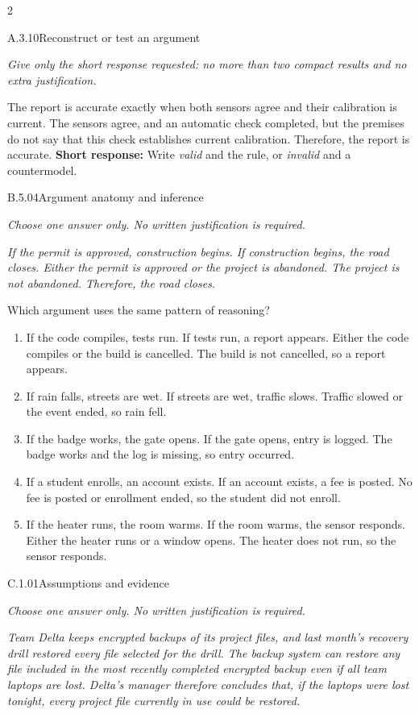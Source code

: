 \documentclass[9pt]{extarticle}
\newcommand{\choice}[1]{\item #1}
\begin{document}
\begin{multicols}{2}
\begin{DenseCoreProblem}{A.3.10}{Reconstruct or test an argument}
{\scriptsize\textit{Give only the short response requested: no more than two compact results and no extra justification.}\par}
The report is accurate exactly when both sensors agree and their calibration is current. The sensors agree, and an automatic check completed, but the premises do not say that this check establishes current calibration. Therefore, the report is accurate.
\textbf{Short response:} Write \emph{valid} and the rule, or \emph{invalid} and a countermodel.
\end{DenseCoreProblem}
\begin{DenseCoreProblem}{B.5.04}{Argument anatomy and inference}
{\scriptsize\textit{Choose one answer only. No written justification is required.}\par}
\emph{If the permit is approved, construction begins. If construction begins, the road closes. Either the permit is approved or the project is abandoned. The project is not abandoned. Therefore, the road closes.}

Which argument uses the same pattern of reasoning?
\begin{enumerate}[label=(\alph*)]
  \choice{If the code compiles, tests run. If tests run, a report appears. Either the code compiles or the build is cancelled. The build is not cancelled, so a report appears.}
  \choice{If rain falls, streets are wet. If streets are wet, traffic slows. Traffic slowed or the event ended, so rain fell.}
  \choice{If the badge works, the gate opens. If the gate opens, entry is logged. The badge works and the log is missing, so entry occurred.}
  \choice{If a student enrolls, an account exists. If an account exists, a fee is posted. No fee is posted or enrollment ended, so the student did not enroll.}
  \choice{If the heater runs, the room warms. If the room warms, the sensor responds. Either the heater runs or a window opens. The heater does not run, so the sensor responds.}
\end{enumerate}
\end{DenseCoreProblem}
\columnbreak
\begin{DenseCoreProblem}{C.1.01}{Assumptions and evidence}
{\scriptsize\textit{Choose one answer only. No written justification is required.}\par}
\emph{Team Delta keeps encrypted backups of its project files, and last month's recovery drill restored every file selected for the drill. The backup system can restore any file included in the most recently completed encrypted backup even if all team laptops are lost. Delta's manager therefore concludes that, if the laptops were lost tonight, every project file currently in use could be restored.}


\end{DenseCoreProblem}
\end{multicols}
\end{document}
